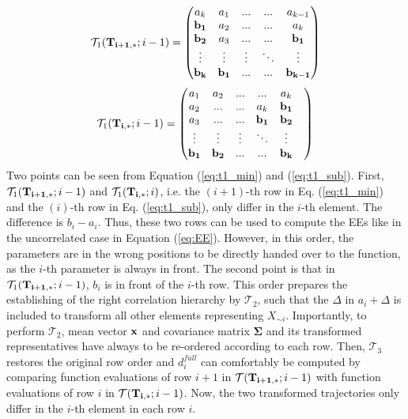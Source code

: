 \begin{align} \label{eq:t1_min}
\mathcal{T}_1(\bold{T_{i+1,*}}; i-1)
=
\begin{pmatrix}
a_k & a_1 & ... & ... &  a_{k-1} \\
\bold{b_1} & a_2 & ... & ... &  a_k \\
\bold{b_2} & a_3 & ... & ... &  \bold{b_1} \\
\vdots & \vdots & \vdots & 	\ddots &  \vdots\\
\bold{b_k} & \bold{b_{1}} & ... & ... &  \bold{b_{k-1}}
\end{pmatrix}
\end{align}
\begin{align} \label{eq:t1_sub}
\mathcal{T}_1(\bold{T_{i,*}}; i-1)=
\begin{pmatrix}
a_1 & a_2 & ... & ... &  a_k \\
a_2 & ... & ... &  a_k & \bold{b_1} \\
a_3 & ... & ... &  \bold{b_1} & \bold{b_2} & \\
\vdots & \vdots & \vdots & 	\ddots &  \vdots\\
\bold{b_1} & \bold{b_{2}} & ... & ... &  \bold{b_{k}}
\end{pmatrix}
\end{align}
Two points can be seen from Equation (\ref{eq:t1_min}) and (\ref{eq:t1_sub}). First, $\mathcal{T}_1(\bold{T_{i+1,*}}; i-1)$ and $\mathcal{T}_1(\bold{T_{i,*}}; i)$, i.e. the $(i+1)$-th row in Eq. (\ref{eq:t1_min}) and the $(i)$-th row in Eq. (\ref{eq:t1_sub}), only differ in the $i$-th element. The difference is $b_i - a_i$. Thus, these two rows can be used to compute the EEs like in the uncorrelated case in Equation (\ref{eq:EE}). However, in this order, the parameters are in the wrong positions to be directly handed over to the function, as the $i$-th parameter is always in front. The second point is that in $\mathcal{T}_1(\bold{T_{i+1,*}}; i-1)$, $b_i$ is in front of the $i$-th row. This order prepares the establishing of the right correlation hierarchy by $\mathcal{T}_2$, such that the $\Delta$ in $a_i + \Delta$ is included to transform all other elements representing $X_{\sim i}$. Importantly, to perform $\mathcal{T}_2$, mean vector $\bold{x}$ and covariance matrix $\pmb{\Sigma}$ and its transformed representatives have always to be re-ordered according to each row. 
Then, $\mathcal{T}_3$ restores the original row order and $d_i^{full}$ can comfortably be computed by comparing function evaluations of row $i+1$ in $\mathcal{T}(\bold{T_{i+1,*}}; i-1)$ with function evaluations of row $i$ in $\mathcal{T}(\bold{T_{i,*}}; i-1)$. Now, the two transformed trajectories only differ in the $i$-th element in each row $i$. \\

